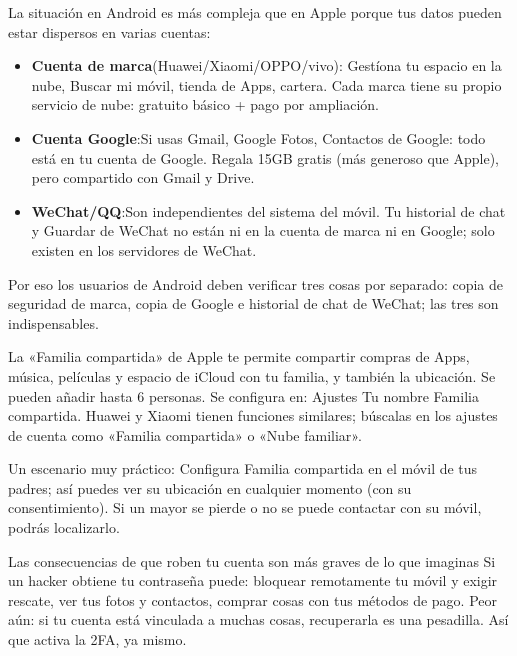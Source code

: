 
La situación en Android es más compleja que en Apple porque tus datos pueden estar dispersos en varias cuentas:

\begin{itemize}
  \item \textbf{Cuenta de marca}(Huawei/Xiaomi/OPPO/vivo): Gestíona tu espacio en la nube, Buscar mi móvil, tienda de Apps, cartera. Cada marca tiene su propio servicio de nube: gratuito básico + pago por ampliación.
  \item \textbf{Cuenta Google}:Si usas Gmail, Google Fotos, Contactos de Google: todo está en tu cuenta de Google. Regala 15GB gratis (más generoso que Apple), pero compartido con Gmail y Drive.
  \item \textbf{WeChat/QQ}:Son independientes del sistema del móvil. Tu historial de chat y Guardar de WeChat no están ni en la cuenta de marca ni en Google; solo existen en los servidores de WeChat.
\end{itemize}

Por eso los usuarios de Android deben verificar tres cosas por separado: copia de seguridad de marca, copia de Google e historial de chat de WeChat; las tres son indispensables.


La «Familia compartida» de Apple te permite compartir compras de Apps, música, películas y espacio de iCloud con tu familia, y también la ubicación. Se pueden añadir hasta 6 personas. Se configura en: Ajustes Tu nombre Familia compartida. Huawei y Xiaomi tienen funciones similares; búscalas en los ajustes de cuenta como «Familia compartida» o «Nube familiar».

Un escenario muy práctico: Configura Familia compartida en el móvil de tus padres; así puedes ver su ubicación en cualquier momento (con su consentimiento). Si un mayor se pierde o no se puede contactar con su móvil, podrás localizarlo.

\begin{tcbwarn}{Las consecuencias de que roben tu cuenta son más graves de lo que imaginas}
Si un hacker obtiene tu contraseña puede: bloquear remotamente tu móvil y exigir rescate, ver tus fotos y contactos, comprar cosas con tus métodos de pago. Peor aún: si tu cuenta está vinculada a muchas cosas, recuperarla es una pesadilla. Así que activa la 2FA, ya mismo.

\end{tcbwarn}

